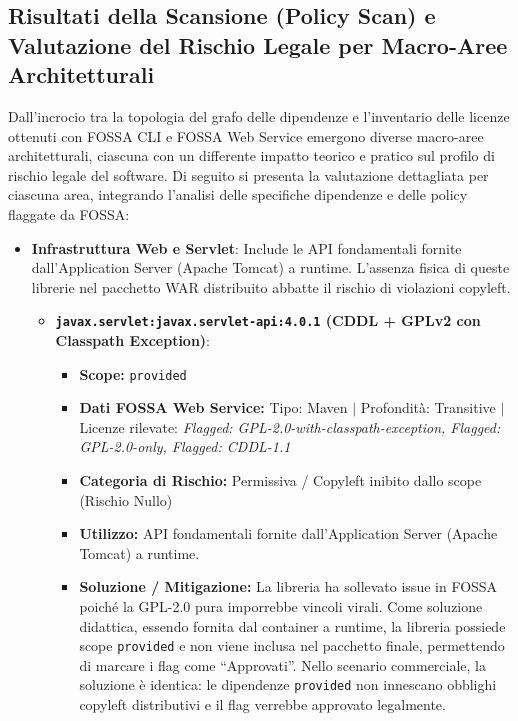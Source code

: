 \subsection{Risultati della Scansione (Policy Scan) e Valutazione del Rischio Legale per Macro-Aree Architetturali}

Dall'incrocio tra la topologia del grafo delle dipendenze e l'inventario delle licenze ottenuti con FOSSA CLI e FOSSA Web Service emergono diverse macro-aree architetturali, ciascuna con un differente impatto teorico e pratico sul profilo di rischio legale del software. Di seguito si presenta la valutazione dettagliata per ciascuna area, integrando l'analisi delle specifiche dipendenze e delle policy flaggate da FOSSA:

\begin{itemize}
    \item \textbf{Infrastruttura Web e Servlet}: 
    Include le API fondamentali fornite dall'Application Server (Apache Tomcat) a runtime. L'assenza fisica di queste librerie nel pacchetto WAR distribuito abbatte il rischio di violazioni copyleft.
    \begin{itemize}
        \item \textbf{\texttt{javax.servlet:javax.servlet-api:4.0.1} (CDDL + GPLv2 con Classpath Exception)}:
        \begin{itemize}
            \item \textbf{Scope:} \texttt{provided}
            \item \textbf{Dati FOSSA Web Service:} Tipo: Maven $\vert$ Profondità: Transitive $\vert$ Licenze rilevate: \textit{Flagged: GPL-2.0-with-classpath-exception, Flagged: GPL-2.0-only, Flagged: CDDL-1.1}
            \item \textbf{Categoria di Rischio:} Permissiva / Copyleft inibito dallo scope (Rischio Nullo)
            \item \textbf{Utilizzo:} API fondamentali fornite dall'Application Server (Apache Tomcat) a runtime.
            \item \textbf{Soluzione / Mitigazione:} La libreria ha sollevato issue in FOSSA poiché la GPL-2.0 pura imporrebbe vincoli virali. Come soluzione didattica, essendo fornita dal container a runtime, la libreria possiede scope \texttt{provided} e non viene inclusa nel pacchetto finale, permettendo di marcare i flag come ``Approvati''. Nello scenario commerciale, la soluzione è identica: le dipendenze \texttt{provided} non innescano obblighi copyleft distributivi e il flag verrebbe approvato legalmente.
        \end{itemize}
    \end{itemize}
    

\end{itemize}
